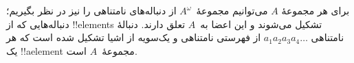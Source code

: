 \documentclass[../../../include/open-logic-section]{subfiles}
\begin{document}
\begin{ex}
برای هر مجموعهٔ $A$ می‌توانیم مجموعهٔ~$A^\omega$ از دنباله‌های
نامتناهی را نیز در نظر بگیریم؛ دنباله‌هایی که از !!{element}s تشکیل
می‌شوند و این اعضا به~$A$ تعلق دارند. دنبالهٔ نامتناهی $a_1a_2a_3a_4\dots$
از فهرستی نامتناهی و یک‌سویه از اشیا تشکیل شده است که هر یک
!!a{element} مجموعهٔ~$A$ است.
\end{ex}
\end{document}

